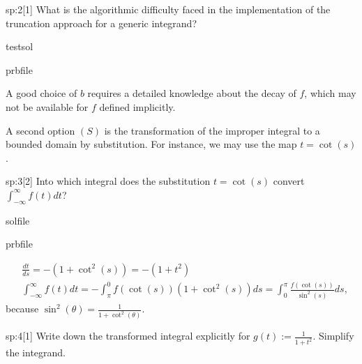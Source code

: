 \begin{samproblem}
\begin{subproblem}{sp:2}[1]
  What is the algorithmic difficulty faced in the implementation of the truncation approach for a generic integrand?

  \begin{samwriteprbpart}{testsol}
    \begin{writeverbatim}{prbfile}
      \begin{samsolution}
        A good choice of $b$ requires a detailed knowledge about the decay of $f$, which may not be available for $f$ defined implicitly.
      \end{samsolution}
    \end{writeverbatim}
  \end{samwriteprbpart}

\end{subproblem}

 A second option $(S)$ is the transformation of the improper integral to a bounded domain by substitution. For instance, we may use the map $t = \cot(s)$.
 
\begin{subproblem}{sp:3}[2]
  Into which integral does the substitution $t = \cot(s)$ convert $\int_{-\infty}^{\infty} f(t) dt$?


  \begin{samwriteprbpart}{solfile}
    \begin{writeverbatim}{prbfile}
      \begin{samsolution}
        \begin{align}
          &\frac{dt}{ds} = - (1+\cot^2(s)) = -(1+t^2) \\
          & \int_{-\infty}^{\infty} f(t) dt = - \int_\pi^0 f(\cot(s)) (1+\cot^2(s)) ds = \int_0^\pi \frac{f(\cot(s))}{\sin^2(s)} ds,
        \end{align}
        because $\sin^2(\theta) = \frac{1}{1+\cot^2(\theta)}$.
      \end{samsolution}
    \end{writeverbatim}
  \end{samwriteprbpart}

\end{subproblem}
 
\begin{subproblem}{sp:4}[1]
  Write down the transformed integral explicitly for $g(t) := \frac{1}{1+t^2}$. Simplify the integrand.


\end{subproblem}
\end{samproblem}
